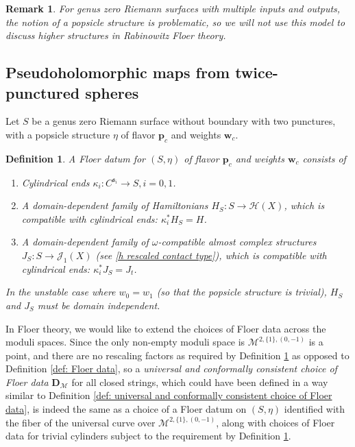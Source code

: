 \documentclass[11pt]{amsproc}
\def\k{\kappa}
\def\M{\mathcal{M}}
\def\sk{\mathfrak{s}}
\newtheorem{defn}[lem]{Definition}
\newtheorem{rem}[lem]{Remark}
\theoremstyle{remark}
\numberwithin{equation}{section}
\begin{document}
\begin{rem}
For genus zero Riemann surfaces with multiple inputs and outputs,
the notion of a popsicle structure is problematic, 
so we will not use this model to discuss higher structures in Rabinowitz Floer theory.
\end{rem}

\subsection{Pseudoholomorphic maps from twice-punctured spheres}

Let $S$ be a genus zero Riemann surface without boundary with two punctures,
with a popsicle structure $\eta$ of flavor $\mathbf{p}_{c}$ and weights $\mathbf{w}_{c}$.

\begin{defn}\label{def: Floer data for closed strings}
A Floer datum for $(S, \eta)$ of flavor $\mathbf{p}_{c}$ and weights $\mathbf{w}_{c}$ consists of
\begin{enumerate}[label=(\roman*)]

\item Cylindrical ends $\k_{i}: C^{\sk_{i}} \to S, i=0, 1$.

\item A domain-dependent family of Hamiltonians $H_{S}: S \to \mathcal{H}(X)$, 
which is compatible with cylindrical ends: $\k_{i}^{*} H_{S} = H$.

\item A domain-dependent family of $\omega$-compatible almost complex structures $J_{S}: S \to \mathcal{J}_{1}(X)$ (see \eqref{h rescaled contact type}),
which is compatible with cylindrical ends: $\k_{i}^{*} J_{S} = J_{t}$.

\end{enumerate}
In the unstable case where $w_{0}=w_{1}$ (so that the popsicle structure is trivial), 
$H_{S}$ and $J_{S}$ must be domain independent.
\end{defn}

In Floer theory, we would like to extend the choices of Floer data across the moduli spaces.
Since the only non-empty moduli space is $\M^{2, \{1\}, (0, -1)}$ is a point,
and there are no rescaling factors as required by Definition \ref{def: Floer data for closed strings} as opposed to Definition \ref{def: Floer data},
so a {\it universal and conformally consistent choice of Floer data} $\mathbf{D}_{\M}$ for all closed strings,
which could have been defined in a way similar to Definition \ref{def: universal and conformally consistent choice of Floer data},
is indeed the same as a choice of a Floer datum on $(S, \eta)$ identified with the fiber of the universal curve over $\M^{2, \{1\}, (0, -1)}$,
along with choices of Floer data for trivial cylinders subject to the requirement by Definition \ref{def: Floer data for closed strings}.
\end{document}
